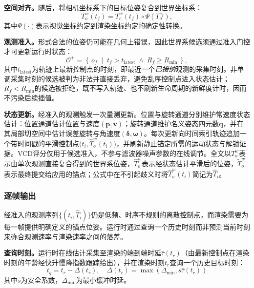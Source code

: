 \documentclass[review]{vgtc}
\begin{document}
\textbf{空间对齐。}随后，将相机坐标系下的目标位姿复合到世界坐标系：
\begin{equation}
T_o^w(t_f)
=
T_c^w(t_f)
\circ
\Psi\!\left(T_o^{c_f}\right),
\label{eq:spatial-alignment}
\end{equation}
其中$\Psi(\cdot)$表示视觉坐标约定到渲染坐标约定的确定性转换。

\textbf{观测准入。}形式合法的位姿仍可能在几何上错误，因此世界系候选须通过准入门控才可更新运行时状态：
\begin{equation}
\mathcal{O}^{+} = \left\{\, o_f \;\middle|\; t_f > t_{\mathrm{latest}} \;\wedge\; R_f \geq R_{\min} \,\right\},
\label{eq:admission}
\end{equation}
其中$t_{\mathrm{latest}}$为轨迹上最新控制点的时刻，即最近一个\emph{已接纳}观测的采集时刻。非单调采集时刻的候选被判为非法并直接丢弃，避免乱序控制点进入状态估计；$R_f < R_{\min}$的候选被拒绝，既不写入轨迹、也不刷新生命周期的新鲜度计时，因而不污染后续插值。

\textbf{状态更新。}经准入的观测触发一次量测更新。位置与旋转通道分别维护常速度状态估计：位置通道估计位置与速度$(\mathbf{p}, \mathbf{v})$；旋转通道维护名义姿态四元数$\mathbf{q}$，并在其局部切空间中估计误差旋转与角速度$(\boldsymbol{\delta}, \boldsymbol{\omega})$。每次更新向时间索引轨迹追加一个带时间戳的平滑控制点$\bigl(t_i, \widehat{T}_o^w(t_i)\bigr)$，并刷新静止锚定所需的运动状态与解锁证据。VCD评分仅用于候选准入，不参与滤波器噪声参数的在线调节。全文以$T_o^w$表示由单次观测直接复合得到的世界系位姿，$\widehat{T}_o^w$表示经状态估计平滑后的位姿，$\widetilde{T}_o^w$表示最终提交给应用的锚点；公式中在不引起歧义时将$\widehat{T}_o^w(t_i)$简记为$\widehat{T}_i$。

\subsubsection{逐帧输出}\label{sec:frame-output}

经准入的观测序列$\{(t_i, \widehat{T}_i)\}$仍是低频、时序不规则的离散控制点，而渲染需要为每一帧提供明确定义的锚点位姿。运行时通过查询一个历史时刻而非预测当前时刻来弥合观测速率与渲染速率之间的落差。

\textbf{查询时刻。}运行时在线估计采集至渲染的端到端时延$\widehat{\tau}(t_r)$（由最新控制点在渲染时刻的年龄经快升慢降指数跟踪给出），并在渲染时刻$t_r$查询一个历史目标时刻：
\begin{equation}
t_q = t_r - \Delta(t_r), \quad \Delta(t_r) = \max\!\left(\Delta_{\min}, s\widehat{\tau}(t_r)\right)
\label{eq:target-time}
\end{equation}
其中$s$为安全系数，$\Delta_{\min}$为最小缓冲时延。
\end{document}
